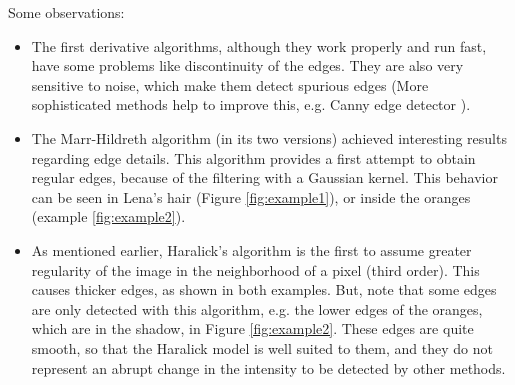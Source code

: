 \documentclass{ipol}
\numberwithin{equation}{section}
\numberwithin{table}{section}
\begin{document}
Some observations: 
\begin{itemize}
	\item The first derivative algorithms, although they work properly and run fast, have some problems like discontinuity of the edges. They are also very sensitive to noise, which make them detect spurious edges (More sophisticated methods help to improve this, e.g. Canny edge detector \cite{Canny1986}). \\
	\item The Marr-Hildreth algorithm (in its two versions) achieved interesting results regarding edge details. This algorithm provides a first attempt to obtain regular edges, because of the filtering with a Gaussian kernel. This behavior can be seen in Lena's hair (Figure \ref{fig:example1}), or inside the oranges (example \ref{fig:example2}). \\
	\item As mentioned earlier, Haralick's algorithm is the first to assume greater regularity of the image in the neighborhood of a pixel (third order). This causes thicker edges, as shown in both examples. But, note that some edges are only detected with this algorithm, e.g. the lower edges of the oranges, which are in the shadow, in Figure \ref{fig:example2}. These edges are quite smooth, so that the Haralick model is well suited to them, and they do not represent an abrupt change in the intensity to be detected by other methods. \\
\end{itemize}
\end{document}

